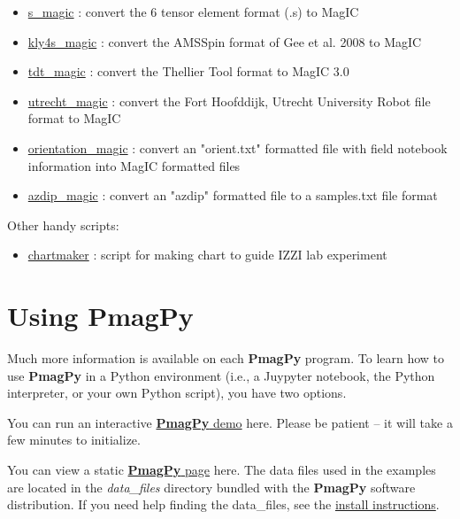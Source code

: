 \documentclass[11pt]{book}
\begin{document}
{{\begin{itemize}
\begin{itemize}
\item \href{http://pmagpy.github.io/PmagPy.html#s_magic}{s\_magic} : convert the 6 tensor element format (.s) to MagIC
\item \href{http://pmagpy.github.io/PmagPy.html#kly4s_magic}{kly4s\_magic} : convert the AMSSpin format of Gee et al. 2008 to MagIC
\item \href{http://pmagpy.github.io/PmagPy.html#tdt_magic}{tdt\_magic} : convert the Thellier Tool format to MagIC 3.0
\item \href{http://pmagpy.github.io/PmagPy.html#utrecht_magic}{utrecht\_magic} : convert the Fort Hoofddijk, Utrecht University Robot file format to MagIC
\item \href{http://pmagpy.github.io/PmagPy.html#orientation_magic}{orientation\_magic} : convert an "orient.txt" formatted file with field notebook information into MagIC formatted files
\item \href{http://pmagpy.github.io/PmagPy.html#azdip_magic}{azdip\_magic} : convert an "azdip" formatted file to a samples.txt file format
  \end{itemize}

\end{itemize}

Other handy scripts:

\begin{itemize}

\item \href{http://pmagpy.github.io/PmagPy.html#chartmaker}{chartmaker} : script for making chart to guide IZZI lab experiment

  \end{itemize}


\section{Using PmagPy}

Much more information is available on each {\bf PmagPy} program.  To learn how to use {\bf PmagPy} in a Python environment (i.e., a Juypyter notebook, the Python interpreter, or your own Python script), you have two options.

You can run an interactive \href{https://mybinder.org/v2/gh/PmagPy/PmagPy-notebooks/master?filepath=PmagPy.ipynb}{{\bf PmagPy} demo} here.  Please be patient -- it will take a few minutes to initialize.

You can view a static \href{http://pmagpy.github.io/PmagPy.html}{{\bf PmagPy} page} here.  The data files used in the examples are located in the {\it data\_files} directory bundled with the {\bf PmagPy} software distribution.  If you need help finding the data\_files, see the \href{#getting_python}{install instructions}.

}}
\end{document}
